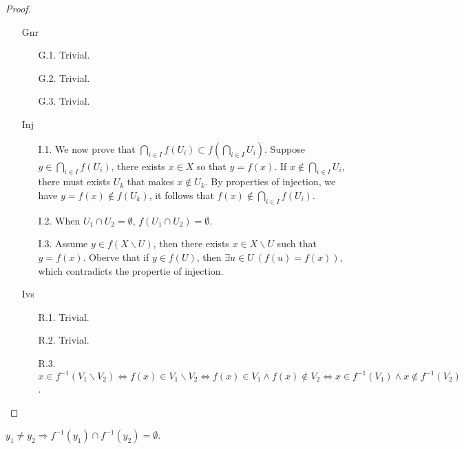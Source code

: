 \begin{proof}
  \begin{enumerate}
    \item[Gnr]
    \begin{enumerate}
      \item[G.1.] Trivial.
      \item[G.2.] Trivial.
      \item[G.3.] Trivial.
    \end{enumerate}
    \item[Inj]
    \begin{enumerate}
      \item[I.1.] We now prove that $\bigcap_{i \in I} f(U_i) \subset f(\bigcap_{i \in I}U_i)$. Suppose $y \in \bigcap_{i \in I} f(U_i)$, there exists $x \in X$ so that $y = f(x)$. If $x \notin \bigcap_{i \in I} U_i$, there must exists $U_k$ that makes $x \notin U_k$. By properties of injection, we have $y = f(x) \notin f(U_k)$, it follows that $f(x) \notin \bigcap_{i \in I} f(U_i)$.
      \item[I.2.] When $U_1 \cap U_2 = \emptyset$, $f(U_1 \cap U_2) = \emptyset$.
      \item[I.3.] Assume $y \in f(X \smallsetminus U)$, then there exists $ x \in X \smallsetminus U$ such that $y = f(x)$. Oberve that if $y \in f(U)$, then $\exists u \in U\ (f(u) = f(x))$, which contradicts the propertie of injection.
    \end{enumerate}
    \item[Ivs]
    \begin{enumerate}
      \item[R.1.] Trivial.
      \item[R.2.] Trivial.
      \item[R.3.] $x \in f^{-1}(V_1 \smallsetminus V_2) \Leftrightarrow f(x) \in V_1 \smallsetminus V_2 \Leftrightarrow f(x) \in V_1 \land f(x) \notin V_2 \Leftrightarrow x \in f^{-1}(V_1) \land x \notin f^{-1}(V_2)$.
    \end{enumerate}
  \end{enumerate}
\end{proof}



\begin{corollary}
  $y_1 \neq y_2 \Rightarrow f^{-1}(y_1) \cap f^{-1}(y_2) = \emptyset$.
\end{corollary}







